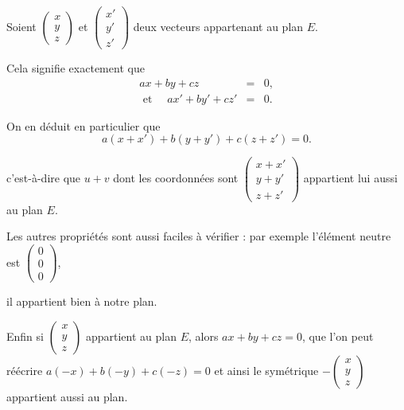 \change

Soient $\left(\begin{smallmatrix}x\\ y\\ z\end{smallmatrix}\right)$ et 
$\left(\begin{smallmatrix}x'\\ y'\\ z'\end{smallmatrix}\right)$ deux vecteurs 
appartenant au plan $E$. 

\change

Cela signifie exactement que  
$$\begin{array}{rcl}
a x + b y + c z & = & 0,\\ 
\text{ et } \quad a x' + b y' + c z' & = & 0.  
\end{array}$$

\change 

On en déduit en particulier que 
$$a (x + x') + b(y + y') + c (z + z') = 0.$$

\change

c'est-à-dire que $u+v$ dont les coordonnées sont 
$\left(\begin{smallmatrix}x + x'\\ y + y'\\ z + z'\end{smallmatrix}\right)$ 
appartient lui aussi au plan $E$.

\change


Les autres propriétés sont aussi faciles à vérifier :
par exemple l'élément neutre est $\left(\begin{smallmatrix}0\\ 0\\ 0\end{smallmatrix}\right)$,

il appartient bien à notre plan.

\change

Enfin si $\left(\begin{smallmatrix}x\\ y\\ z\end{smallmatrix}\right)$ appartient  
au plan $E$, alors $a x + b y + c z  =  0$,
que l'on peut réécrire $a(-x)+b(-y)+c(-z)=0$ et ainsi le symétrique 
$-\left(\begin{smallmatrix}x\\ y\\ z\end{smallmatrix}\right)$ appartient aussi au plan.


